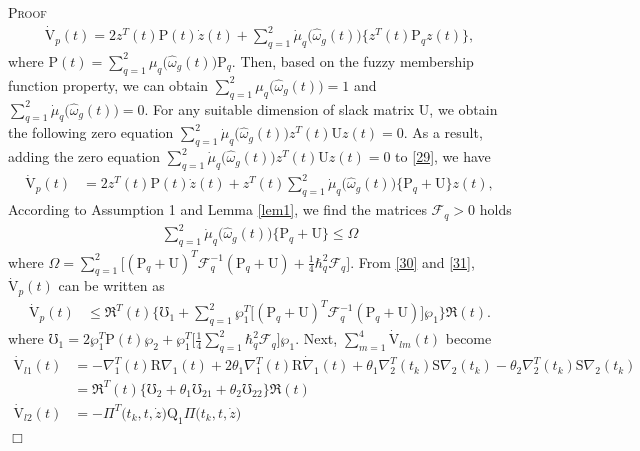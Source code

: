 \documentclass[preprint,11pt]{elsarticle}
\newenvironment{proof}{\noindent \textsc{Proof}\ }{\mbox{}\hfill $\Box$\\}
\begin{document}
\begin{proof}
\begin{align}
\mathrm{\dot{V}}_p(t)=2z^T(t)\mathrm{P}(t)\dot{z}(t)
+\sum^{2}_{q=1}\dot{\mu}_q\big( \hat{\omega}_g(t) \big)\big\{z^T(t)\mathrm{P}_qz(t)\big\},\label{29}
\end{align}
where $\mathrm{P}(t)=\sum^{2}_{q=1}\mu_q\big( \hat{\omega}_g(t) \big)\mathrm{P}_q$. Then, based on the fuzzy membership function property, we can obtain
$\sum^{2}_{q=1}\mu_q\big( \hat{\omega}_g(t) \big)=1$ and  $\sum^{2}_{q=1}\dot{\mu}_q\big( \hat{\omega}_g(t) \big)=0$. For any suitable dimension of slack matrix $\mathrm{U}$, we obtain the following zero equation $\sum^{2}_{q=1}\dot{\mu}_q\big( \hat{\omega}_g(t) \big)z^T(t)\mathrm{U}z(t)=0$. As a result, adding the zero equation $\sum^{2}_{q=1}\dot{\mu}_q\big( \hat{\omega}_g(t) \big)z^T(t)\mathrm{U}z(t)=0$ to \eqref{29}, we have
\begin{align}
\mathrm{\dot{V}}_p(t)&=2z^T(t)\mathrm{P}(t)\dot{z}(t)
+z^T(t)\sum^{2}_{q=1}\dot{\mu}_q\big( \hat{\omega}_g(t) \big)\big\{\mathrm{P}_q+\mathrm{U}\big\}z(t),\label{30}
\end{align}
According to Assumption 1 and Lemma \ref{lem1}, we find the matrices {$\mathcal{F}_q>0$} holds
\begin{align}
\sum^{2}_{q=1}\dot{\mu}_q\big( \hat{\omega}_g(t) \big)\big\{\mathrm{P}_q+\mathrm{U}\big\}\leq \Omega\label{31}
\end{align}
where $\Omega=\sum^{2}_{q=1}\big[(\mathrm{P}_q+\mathrm{U})^T  {\mathcal{F}^{-1}_q} (\mathrm{P}_q+\mathrm{U}) +\frac{1}{4} \hbar_q^2{\mathcal{F}_q}\big]$.
From \eqref{30} and \eqref{31}, $\mathrm{\dot{V}}_p(t)$ can be written as
\begin{align}
\mathrm{\dot{V}}_p(t)&\leq \Re^T(t) \Big\{\mho_1+\sum^{2}_{q=1}\wp^T_1\big[(\mathrm{P}_q+\mathrm{U})^T  {\mathcal{F}^{-1}_q}
(\mathrm{P}_q+\mathrm{U})\big]\wp_1\Big\} \Re(t).\label{32}
\end{align}
{where $\mho_1=2\wp^T_1\mathrm{P}(t)\wp_2+\wp^T_1\big[\frac{1}{4} \sum^{2}_{q=1}\hbar_q^2\mathcal{F}_q\big]\wp_1$.}
Next, $\sum^4_{m=1}\mathrm{\dot{V}}_{lm}(t)$ become
\begin{align}
\mathrm{\dot{V}}_{l1}(t)&=-\nabla^T_1(t)\mathrm{R}\nabla_1(t)+2\theta_1\nabla^T_1(t)\mathrm{R}\dot{\nabla}_1(t)
+\theta_1\nabla^T_2(t_k)\mathrm{S}\nabla_2(t_k)-\theta_2\nabla^T_2(t_k)\mathrm{S}\nabla_2(t_k)\nonumber\\
&=\Re^T(t) \big\{\mho_2+\theta_1\mho_{21}+\theta_2\mho_{22}\big\}\Re(t)\label{33}\\
\mathrm{\dot{V}}_{l2}(t)&=-\Pi^T\big(t_k,t,\dot{z}\big)\mathrm{Q}_1\Pi\big(t_k,t,\dot{z}\big)

\end{align}
\end{proof}
\end{document}
